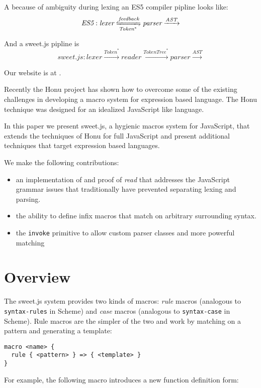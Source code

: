 \documentclass[preprint,10pt]{sigplanconf}
\begin{document}
A because of ambiguity during lexing an ES5 compiler pipline looks
like:
\[
\textit{ES5} :
\textit{lexer} \xleftrightharpoons[\textit{Token}^{*}]{\textit{feedback}}
\textit{parser} \xrightarrow{\textit{AST}}
\]

And a sweet.js pipline is
\[
\textit{sweet.js} :
\textit{lexer} \xrightarrow{\textit{Token}^{*}}
\textit{reader} \xrightarrow{\textit{TokenTree}^{*}}
\textit{parser} \xrightarrow{\textit{AST}}
\]

Our website is at \cite{Disney2014}.

Recently the Honu project \cite{Rafkind2012,Rafkind2013} has shown how
to overcome some of the existing challenges in developing a macro
system for expression based language. The Honu technique was designed
for an idealized JavaScript like language. 

In this paper we present sweet.js, a hygienic macros system for
JavaScript, that extends the techniques of Honu for full JavaScript
and present additional techniques that target expression based
languages.


We make the following contributions:

\begin{itemize}
\item an implementation of and proof of \textit{read} that addresses
  the JavaScript grammar issues that traditionally have prevented
  separating lexing and parsing.
\item the ability to define infix macros that match on arbitrary
  surrounding syntax.
\item the \texttt{invoke} primitive to allow custom parser classes and
  more powerful matching
\end{itemize}

\section{Overview}

The sweet.js system provides two kinds of macros: \emph{rule} macros
(analogous to \lstinline!syntax-rules! in Scheme) and \emph{case}
macros (analogous to \lstinline!syntax-case! in Scheme). Rule macros
are the simpler of the two and work by matching on a pattern and
generating a template:

\begin{lstlisting}
macro <name> {
  rule { <pattern> } => { <template> }
}
\end{lstlisting}

For example, the following macro introduces a new function definition
form:
\end{document}
